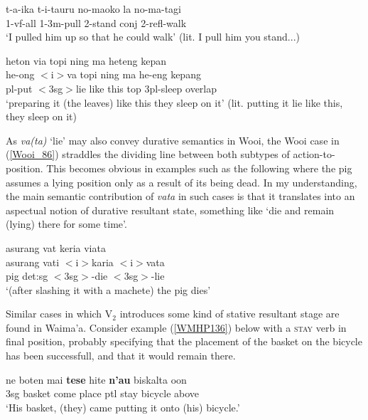 \ea \label{Tobelo_20}
\gll t-a-ika t-i-tauru no-maoko la no-ma-tagi \\
1-vf-\acs{all} 1-3\acs{m}-pull 2-stand \acs{conj} 2-\acs{refl}-walk \\
\glft `I pulled him up so that he could walk' (lit. I pull him you stand...) \\ 
\z
\xe

\ea \label{Wooi_86}
\gll heton via topi ning ma heteng kepan \\
he-ong $<$i$>$va topi ning ma he-eng kepang \\
\acs{pl}-put $<$3\acs{sg}$>$lie like this \acs{top} 3\acs{pl}-sleep overlap \\
\glft `preparing it (the leaves) like this they sleep on it' (lit. putting it lie like this, they sleep on it) \\ 
\z
\xe

As \textit{va(ta)} `lie' may also convey durative semantics in Wooi, the Wooi case in (\ref{Wooi_86}) straddles the dividing line between both subtypes of action-to-position. This becomes obvious in examples such as the following where the pig assumes a lying position only as a result of its being dead. In my understanding, the main semantic contribution of \textit{vata} in such cases is that it translates into an aspectual notion of durative resultant state, something like `die and remain (lying) there for some time'. 

\ea \label{}
\gll asurang vat keria viata \\
asurang vati $<$i$>$karia $<$i$>$vata \\
\glc pig \acs{det}:\acs{sg} $<$3\acs{sg}$>$-die $<$3\acs{sg}$>$-lie \\
\glft `(after slashing it with a machete) the pig dies' \\ 
\z
\xe

Similar cases in which V$_2$ introduces some kind of stative resultant stage are found in Waima'a. Consider example (\ref{WMHP136}) below with a \textsc{stay} verb in final position, probably specifying that the placement of the basket on the bicycle has been successfull, and that it would remain there.

\ea \label{WMHP136}
\gll ne boten mai \textbf{tese} hite \textbf{n'au} biskalta oon \\
\acs{3}\acs{sg} basket come place \acs{ptl} stay bicycle above \\
\glft `His basket, (they) came putting it onto (his) bicycle.' \\ 
\z
\xe

